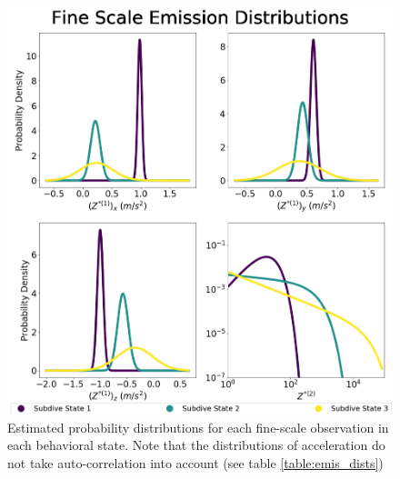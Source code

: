 \begin{figure}[ht]
	\centering
	\includegraphics[width=5in]{../Plots/fine-emissions.png}
	\caption{Estimated probability distributions for each fine-scale observation in each behavioral state. Note that the distributions of acceleration do not take auto-correlation into account (see table \ref{table:emis_dists})}
	\label{fig:fine_emis}
\end{figure}

